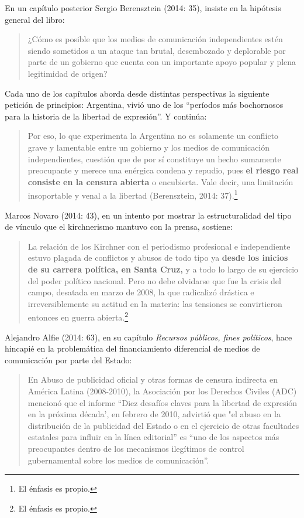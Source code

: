 {En un capítulo posterior Sergio Berensztein (2014: 35), insiste en la hipótesis general del libro:

\begin{quote}
¿Cómo es posible que los medios de comunicación independientes estén siendo sometidos a un ataque tan brutal, desembozado y deplorable por parte de un gobierno que cuenta con un importante apoyo popular y plena legitimidad de origen?
\end{quote}

Cada uno de los capítulos aborda desde distintas perspectivas la siguiente petición de principios: Argentina, vivió uno de los ``períodos más bochornosos para la historia de la libertad de expresión''. Y continúa:

\begin{quote}
Por eso, lo que experimenta la Argentina no es solamente un conflicto grave y lamentable entre un gobierno y los medios de comunicación independientes, cuestión que de por sí constituye un hecho sumamente preocupante y merece una enérgica condena y repudio, pues \textbf{el riesgo real consiste en la censura abierta} o encubierta. Vale decir, una limitación insoportable y venal a la libertad (Berensztein, 2014: 37).\footnote{El énfasis es propio.}
\end{quote}

Marcos Novaro (2014: 43), en un intento por mostrar la estructuralidad del tipo de vínculo que el kirchnerismo mantuvo con la prensa, sostiene:

\begin{quote}
La relación de los Kirchner con el periodismo profesional e independiente estuvo plagada de conflictos y abusos de todo tipo ya \textbf{desde los inicios de su carrera política, en Santa Cruz,} y a todo lo largo de su ejercicio del poder político nacional. Pero no debe olvidarse que fue la crisis del campo, desatada en marzo de 2008, la que radicalizó drástica e irreversiblemente su actitud en la materia: las tensiones se convirtieron entonces en guerra abierta.\footnote{El énfasis es propio.}
\end{quote}

Alejandro Alfie (2014: 63), en su capítulo \emph{Recursos públicos, fines políticos}, hace hincapié en la problemática del financiamiento diferencial de medios de comunicación por parte del Estado:

\begin{quote}
En Abuso de publicidad oficial y otras formas de censura indirecta en América Latina (2008-2010), la Asociación por los Derechos Civiles (ADC) mencionó que el informe ``Diez desafíos claves para la libertad de expresión en la próxima década', en febrero de 2010, advirtió que "el abuso en la distribución de la publicidad del Estado o en el ejercicio de otras facultades estatales para influir en la línea editorial'' es ``uno de los aspectos más preocupantes dentro de los mecanismos ilegítimos de control gubernamental sobre los medios de comunicación''.
\end{quote}

}
